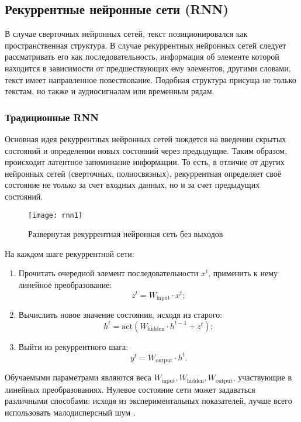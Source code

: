 \subsection{Рекуррентные нейронные сети (RNN)}
В случае сверточных нейронных сетей, текст позиционировался как пространственная структура. 
В случае рекуррентных нейронных сетей \cite{Schmidhuber2015, Schmidhuber:1996} следует рассматривать его как последовательность,
информация об элементе которой находится в зависимости от предшествующих ему элементов, 
другими словами, текст имеет направленное повествование. 
Подобная структура присуща не только текстам, но также и аудиосигналам или временным рядам.  
\subsubsection{Традиционные RNN}
Основная идея рекуррентных нейронных сетей зиждется на введении скрытых состояний 
и определении новых состояний через предыдущие. Таким образом, происходит латентное запоминание информации.
 То есть, в отличие от других нейронных сетей (сверточных, полносвязных), рекуррентная определяет своё состояние 
 не только за счет входных данных, но и за счет предыдущих состояний.
 \begin{figure}[ht]
     \centering
     \texttt{[image: rnn1]}
     \label{rnn1}
     \caption{Развернутая рекуррентная нейронная сеть без выходов}
 \end{figure}
 
 На каждом шаге рекуррентной сети:
 \begin{enumerate}
     \item Прочитать очередной элемент последовательности $x^{t}$,
      применить к нему линейное преобразование:
      \[z^{t} = W_{\text{input}} \cdot x^t;\]
     \item Вычислить новое значение состояния, исходя из старого:
      \[h^{t} = \mathrm{act} \left(W_{\text{hidden}} \cdot h^{t-1} + z^{t}\right);\]
     \item Выйти из рекуррентного шага:
      \[y^{t} = W_{\text{output}} \cdot h^{t}.\]
 \end{enumerate}

 \bigskip\par
 Обучаемыми параметрами являются веса $W_{\text{input}}, W_{\text{hidden}}, W_{\text{output}}$, участвующие в линейных преобразованиях.
Нулевое состояние сети может задаваться различными способами: исходя из экспериментальных показателей, лучше всего использовать малодисперсный шум \cite{Goodfellow}.

